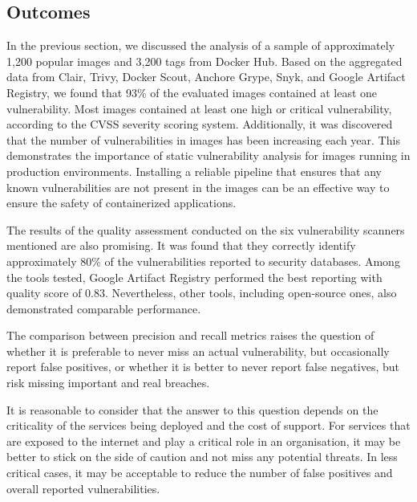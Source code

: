 
\subsection{Outcomes}

In the previous section, we discussed the analysis of a sample of approximately 1,200 popular images and 3,200 tags from Docker Hub. Based on the aggregated data from Clair, Trivy, Docker Scout, Anchore Grype, Snyk, and Google Artifact Registry, we found that 93\% of the evaluated images contained at least one vulnerability. Most images contained at least one high or critical vulnerability, according to the CVSS severity scoring system. Additionally, it was discovered that the number of vulnerabilities in images has been increasing each year. This demonstrates the importance of static vulnerability analysis for images running in production environments. Installing a reliable pipeline that ensures that any known vulnerabilities are not present in the images can be an effective way to ensure the safety of containerized applications.

The results of the quality assessment conducted on the six vulnerability scanners mentioned are also promising. It was found that they correctly identify approximately 80\% of the vulnerabilities reported to security databases. Among the tools tested, Google Artifact Registry performed the best reporting with quality score of 0.83. Nevertheless, other tools, including open-source ones, also demonstrated comparable performance.

The comparison between precision and recall metrics raises the question of whether it is preferable to never miss an actual vulnerability, but occasionally report false positives, or whether it is better to never report false negatives, but risk missing important and real breaches.

It is reasonable to consider that the answer to this question depends on the criticality of the services being deployed and the cost of support. For services that are exposed to the internet and play a critical role in an organisation, it may be better to stick on the side of caution and not miss any potential threats. In less critical cases, it may be acceptable to reduce the number of false positives and overall reported vulnerabilities.

